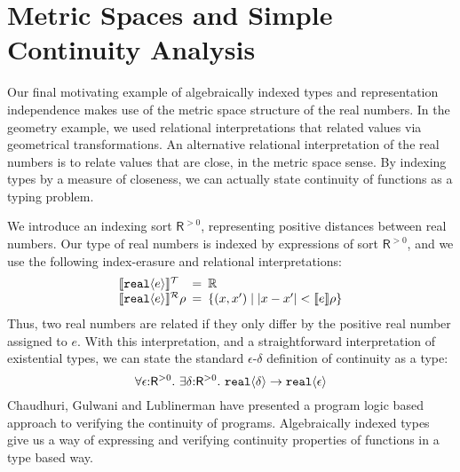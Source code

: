 \section{Metric Spaces and Simple Continuity Analysis}
\label{sec:continuity-analysis}

Our final motivating example of algebraically indexed types and
representation independence makes use of the metric space structure of
the real numbers. In the geometry example, we used relational
interpretations that related values via geometrical
transformations. An alternative relational interpretation of the real
numbers is to relate values that are close, in the metric space
sense. By indexing types by a measure of closeness, we can actually
state continuity of functions as a typing problem.

We introduce an indexing sort $\mathsf{R}^{>0}$, representing positive
distances between real numbers. Our type of real numbers is indexed by
expressions of sort $\mathsf{R}^{>0}$, and we use the following
index-erasure and relational interpretations:
\begin{displaymath}
  \begin{array}{l@{\hspace{0.5em}=\hspace{0.5em}}l}
    \tySem{\tyPrim{real}{e}} & \mathbb{R} \\
    \rsem{\tyPrim{real}{e}}{}\rho & \{ (x,x') \sepbar |x-x'| < \sem{e}\rho \}
  \end{array}
\end{displaymath}
Thus, two real numbers are related if they only differ by the positive
real number assigned to $e$. With this interpretation, and a
straightforward interpretation of existential types, we can state the
standard $\epsilon$-$\delta$ definition of continuity as a type:
\begin{displaymath}
  \forall \epsilon \mathord: \mathsf{R}^{>0}.\ \exists \delta\mathord: \mathsf{R}^{>0}.\ \textup{\texttt{real}}\langle \delta \rangle \to \textup{\texttt{real}}\langle \epsilon \rangle
\end{displaymath}
Chaudhuri, Gulwani and Lublinerman \cite{chaudhuri10continuity} have
presented a program logic based approach to verifying the continuity
of programs. Algebraically indexed types give us a way of expressing
and verifying continuity properties of functions in a type based way.

